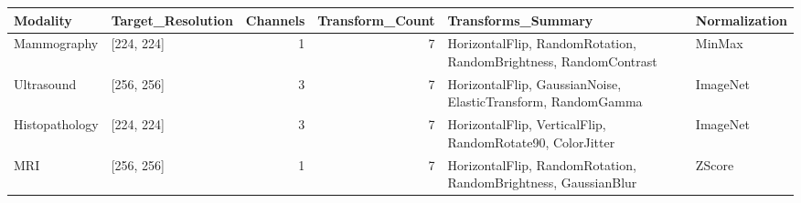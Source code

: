 \begin{tabular}{llrrll}
\toprule
Modality & Target\_Resolution & Channels & Transform\_Count & Transforms\_Summary & Normalization \\
\midrule
Mammography & [224, 224] & 1 & 7 & HorizontalFlip, RandomRotation, RandomBrightness, RandomContrast & MinMax \\
Ultrasound & [256, 256] & 3 & 7 & HorizontalFlip, GaussianNoise, ElasticTransform, RandomGamma & ImageNet \\
Histopathology & [224, 224] & 3 & 7 & HorizontalFlip, VerticalFlip, RandomRotate90, ColorJitter & ImageNet \\
MRI & [256, 256] & 1 & 7 & HorizontalFlip, RandomRotation, RandomBrightness, GaussianBlur & ZScore \\
\bottomrule
\end{tabular}
